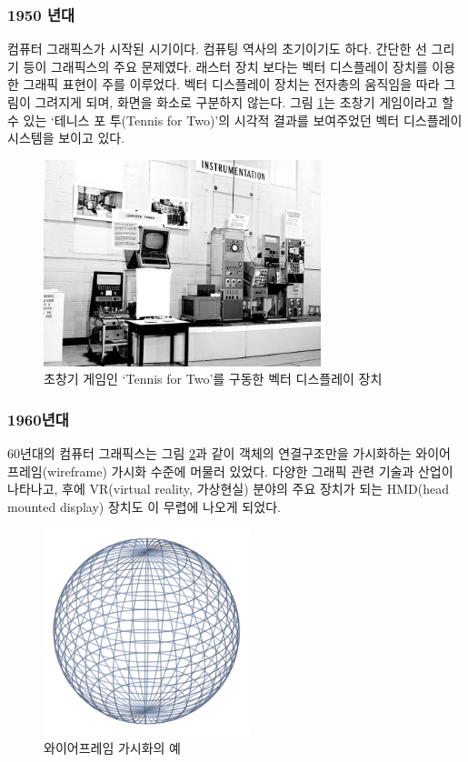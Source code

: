 \subsubsection{1950 년대}

컴퓨터 그래픽스가 시작된 시기이다. 컴퓨팅 역사의 초기이기도 하다. 간단한 선 그리기 등이 그래픽스의 주요 문제였다. 래스터 장치 보다는 벡터 디스플레이 장치를 이용한 그래픽 표현이 주를 이루었다. 벡터 디스플레이 장치는 전자총의 움직임을 따라 그림이 그려지게 되며, 화면을 화소로 구분하지 않는다. 그림 \ref{fig:OGL_intro:tennis4two}는 초창기 게임이라고 할 수 있는 `테니스 포 투(Tennis for Two)'의 시각적 결과를 보여주었던 벡터 디스플레이 시스템을 보이고 있다.

\begin{figure}[h!]
  \centering
    \includegraphics[height=6cm]{OGL_intro/tennis4two.jpg}
    \caption{초창기 게임인 `Tennis for Two'를 구동한 벡터 디스플레이 장치}
    \label{fig:OGL_intro:tennis4two}
\end{figure}

\subsubsection{1960년대}

60년대의 컴퓨터 그래픽스는 그림 \ref{fig:OGL_intro:wireframe}과 같이 객체의 연결구조만을 가시화하는 와이어 프레임(wireframe) 가시화 수준에 머물러 있었다. 다양한 그래픽 관련 기술과 산업이 나타나고, 후에 VR(virtual reality, 가상현실) 분야의 주요 장치가 되는 HMD(head mounted display) 장치도 이 무렵에 나오게 되었다. 

\begin{figure}[h!]
  \centering
    \includegraphics[height=6cm]{OGL_intro/wireframe.png}
    \caption{와이어프레임 가시화의 예}
    \label{fig:OGL_intro:wireframe}
\end{figure}

